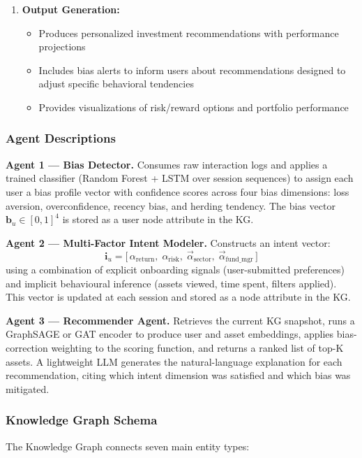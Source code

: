\documentclass[12pt, a4paper]{article}
\begin{document}
\begin{enumerate}[leftmargin=1.5cm]
  \item \textbf{Output Generation:}
  \begin{itemize}
    \item Produces personalized investment recommendations with performance projections
    \item Includes bias alerts to inform users about recommendations designed to adjust specific behavioral tendencies
    \item Provides visualizations of risk/reward options and portfolio performance
  \end{itemize}
\end{enumerate}

\subsubsection{Agent Descriptions}

\textbf{Agent 1 --- Bias Detector.}
Consumes raw interaction logs and applies a trained classifier (Random Forest + LSTM over
session sequences) to assign each user a bias profile vector with confidence scores across
four bias dimensions: loss aversion, overconfidence, recency bias, and herding tendency.
The bias vector $\mathbf{b}_u \in [0,1]^4$ is stored as a user node attribute in the KG.

\textbf{Agent 2 --- Multi-Factor Intent Modeler.}
Constructs an intent vector:
\[
\mathbf{i}_u = \bigl[\,\alpha_{\text{return}},\;\alpha_{\text{risk}},\;\vec{\alpha}_{\text{sector}},\;\vec{\alpha}_{\text{fund\_mgr}}\,\bigr]
\]
using a combination of explicit onboarding signals (user-submitted preferences) and
implicit behavioural inference (assets viewed, time spent, filters applied). This vector
is updated at each session and stored as a node attribute in the KG.

\textbf{Agent 3 --- Recommender Agent.}
Retrieves the current KG snapshot, runs a GraphSAGE or GAT encoder to produce user and
asset embeddings, applies bias-correction weighting to the scoring function, and returns a
ranked list of top-K assets. A lightweight LLM generates the natural-language explanation
for each recommendation, citing which intent dimension was satisfied and which bias was
mitigated.

\subsubsection{Knowledge Graph Schema}

The Knowledge Graph connects seven main entity types:
\end{document}
